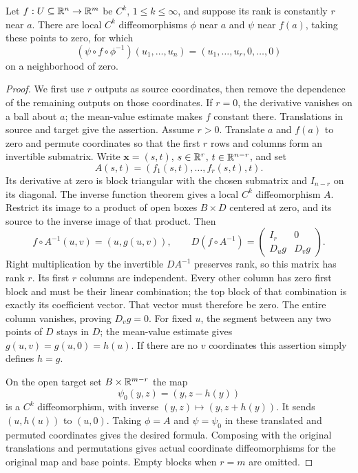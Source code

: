\begin{theorem}\label{thm:constant-rank}
Let $f:U\subseteq\mathbb{R}^n\to\mathbb{R}^m$ be $C^k$, $1\leq k\leq\infty$,
and suppose its rank is constantly $r$ near $a$. There are local
$C^k$ diffeomorphisms $\phi$ near $a$ and $\psi$ near $f(a)$, taking
these points to zero, for which
\[
(\psi\circ f\circ\phi^{-1})(u_1,\ldots,u_n)
=(u_1,\ldots,u_r,0,\ldots,0)
\]
on a neighborhood of zero.
\end{theorem}
\begin{proof}
We first use $r$ outputs as source coordinates, then remove the dependence
of the remaining outputs on those coordinates. If $r=0$, the derivative
vanishes on a ball about $a$; the mean-value estimate makes $f$ constant
there. Translations in source and target give the assertion. Assume $r>0$.
Translate $a$ and $f(a)$ to zero and permute coordinates so that the
first $r$ rows and columns form an invertible submatrix. Write $\mathbf{x}=(s,t)$,
$s\in\mathbb{R}^r$, $t\in\mathbb{R}^{n-r}$, and set
\[
A(s,t)=(f_1(s,t),\ldots,f_r(s,t),t).
\]
Its derivative at zero is block triangular with the chosen submatrix and
$I_{n-r}$ on its diagonal. The inverse function theorem gives a local
$C^k$ diffeomorphism $A$. Restrict its image to a product of open boxes
$B\times D$ centered at zero, and its source to the inverse image of that
product. Then
\[
f\circ A^{-1}(u,v)=(u,g(u,v)),\qquad
D(f\circ A^{-1})=
\begin{pmatrix}I_r&0\\D_ug&D_vg\end{pmatrix}.
\]
Right multiplication by the invertible $DA^{-1}$ preserves rank, so this
matrix has rank $r$. Its first $r$ columns are independent. Every other
column has zero first block and must be their linear combination; the top
block of that combination is exactly its coefficient vector. That vector
must therefore be zero. The entire column vanishes, proving $D_vg=0$.
For fixed $u$, the segment between any two points of $D$ stays in $D$;
the mean-value estimate gives $g(u,v)=g(u,0)=h(u)$.
If there are no $v$ coordinates this assertion simply defines $h=g$.

On the open target set $B\times\mathbb{R}^{m-r}$ the map
\[
\psi_0(y,z)=(y,z-h(y))
\]
is a $C^k$ diffeomorphism, with inverse $(y,z)\mapsto(y,z+h(y))$.
It sends $(u,h(u))$ to $(u,0)$. Taking $\phi=A$ and $\psi=\psi_0$
in these translated and permuted coordinates gives the desired formula.
Composing with the original translations and permutations gives actual
coordinate diffeomorphisms for the original map and base points.
Empty blocks when $r=m$ are omitted.
\end{proof}
